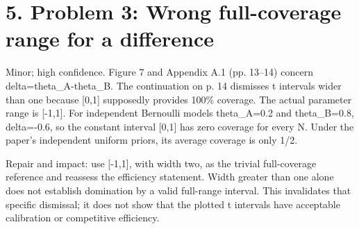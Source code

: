 \documentclass[10pt]{article}
\begin{document}
\section*{5. Problem 3: Wrong full-coverage range for a difference}
Minor; high confidence. Figure 7 and Appendix A.1 (pp. 13–14) concern delta=theta\_A-theta\_B. The continuation on p. 14 dismisses t intervals wider than one because [0,1] supposedly provides 100\% coverage. The actual parameter range is [-1,1]. For independent Bernoulli models theta\_A=0.2 and theta\_B=0.8, delta=-0.6, so the constant interval [0,1] has zero coverage for every N. Under the paper’s independent uniform priors, its average coverage is only 1/2.\par
Repair and impact: use [-1,1], with width two, as the trivial full-coverage reference and reassess the efficiency statement. Width greater than one alone does not establish domination by a valid full-range interval. This invalidates that specific dismissal; it does not show that the plotted t intervals have acceptable calibration or competitive efficiency.\par
\end{document}
